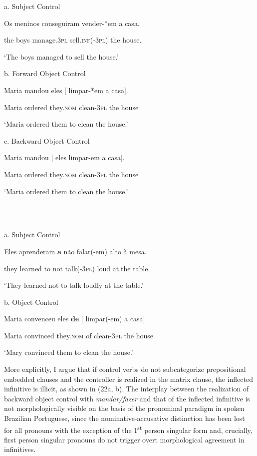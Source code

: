\documentclass[output=paper]{langsci/langscibook}
\begin{document}
          a.    Subject Control

Os meninos  conseguiram  vender-*em   a casa.  

           the boys  manage.\textsc{3pl}   sell.\textsc{inf}(-\textsc{3pl}) the house.

‘The boys managed to sell the house.’

     b.  Forward Object Control

Maria mandou   eles    [ limpar-*em a    casa].    

    Maria ordered    they.\textsc{nom}   clean{}-\textsc{3pl}     the house

    ‘Maria ordered them  to clean the house.’

c.  Backward Object Control

Maria mandou       [ eles limpar-em a        casa].    

    Maria ordered          they.\textsc{nom}   clean{}-\textsc{3pl}     the house

    ‘Maria ordered them to clean the house.’

\ea%
    \label{ex:key:23}
    \gll\\
        \\
    \glt
    \z

          a.  Subject Control

Eles     aprenderam \textbf{a}  não   falar(-em)  alto  à        mesa.

    they    learned         to not    talk({}-\textsc{3pl})    loud at.the table  

    ‘They learned not to talk loudly at the table.’

b.  Object Control

Maria  convenceu eles          \textbf{de}  [  limpar(-em) a    casa].     

Maria  convinced they.\textsc{nom} of     clean-\textsc{3pl}     the house

‘Mary convinced them to clean the house.’

More explicitly, I argue that if control verbs do not subcategorize prepositional embedded clauses and the controller is realized in the matrix clause, the inflected infinitive is illicit, as shown in (22a, b). The interplay between the realization of backward object control with \textit{mandar/fazer} and that of the inflected infinitive is not morphologically visible on the basis of the pronominal paradigm in spoken Brazilian Portuguese, since the nominative-accusative distinction has been lost for all pronouns with the exception of the 1\textsuperscript{st} person singular form and, crucially, first person singular pronouns do not trigger overt morphological agreement in infinitives. 
\end{document}
